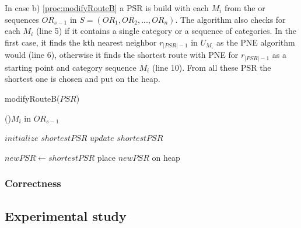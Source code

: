 \pagebreak

In case b) \ref{proc:modifyRouteB} a PSR is build with each $M_i$ from the or sequences $OR_{s-1}$ in $S = (OR_1, OR_2, ..., OR_n)$. The algorithm also checks for each $M_i$ (line 5) if it contains a single category or a sequence of categories. In the first case, it finds the kth nearest neighbor $r_{|PSR|-1}$ in $U_{M_{i}}$ as the PNE algorithm would (line 6), otherwise it finds the shortest route with PNE for $r_{|PSR|-1}$ as a starting point and category sequence $M_i$ (line 10). From all these PSR the shortest one is chosen and put on the heap.\newline

\begin{procedure}[H]
	\label{proc:modifyRouteB}
	\caption{modifyRouteB($PSR$)}
	\ForEach(){$M_i$ in $OR_{s-1}$}{
		$initialize$ $shortestPSR$\;
		{
			\;
			$update$ $shortestPSR$\;
		}	
		
	}
	$newPSR \leftarrow shortestPSR$\;
	place $newPSR$ on heap\;
\end{procedure}


\subsubsection{Correctness}
\label{sec:correctnessOr}

\subsection{Experimental study}
\label{sec:experimentsOr}
